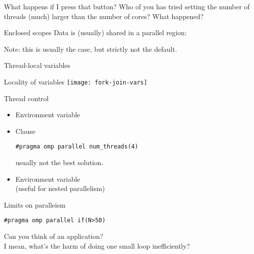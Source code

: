\begin{exerciseframe}[parallel]
  
\end{exerciseframe}

\begin{exerciseframe}[parallel]
  
\end{exerciseframe}

\begin{numberedframe}{What happens if I press that button?}
  Who of you has tried setting the number of threads (much) larger
  than the number of cores? What happened?
\end{numberedframe}

\begin{numberedframe}{Enclosed scopes}
  Data is (usually) shared in a parallel region:
  
  Note: this is usually the case,
  but strictly not the default.
\end{numberedframe}

\begin{numberedframe}{Thread-local variables}
  
\end{numberedframe}

\begin{numberedframe}{Locality of variables}
  \texttt{[image: fork-join-vars]}
\end{numberedframe}

\begin{numberedframe}{Thread control}
  \begin{itemize}
  \item Environment variable 
  \item Clause \\
\begin{lstlisting}
#pragma omp parallel num_threads(4)
\end{lstlisting}
    usually not the best solution.
  \item Environment variable \\
    (useful for nested parallelism)
  \end{itemize}
\end{numberedframe}

\begin{numberedframe}{Limits on paralleism}
\begin{lstlisting}
#pragma omp parallel if(N>50)
\end{lstlisting}
Can you think of an application?\\
I mean, what's the harm of doing one small loop inefficiently?
\end{numberedframe}

